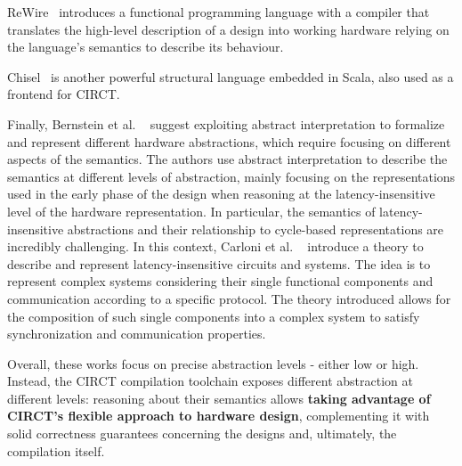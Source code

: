 \documentclass[sigconf,authorversion,nonacm, 11pt]{acmart}
\begin{document}
ReWire~\cite{procter2015semantics} introduces a functional programming language with a compiler that translates the high-level 
description of a design into working hardware relying on the language's semantics to describe its behaviour.

Chisel~\cite{bachrach2012chisel} is another powerful structural language embedded in Scala, also used as a frontend for CIRCT. 

Finally, Bernstein et al. ~\cite{bernstein2021semantics} suggest exploiting abstract interpretation to formalize and represent 
different hardware abstractions, which require focusing on different aspects of the semantics. 
The authors use abstract interpretation to describe the semantics at different levels of abstraction, 
mainly focusing on the representations used in the early phase of the design when reasoning at the latency-insensitive level of the hardware representation.
In particular, the semantics of latency-insensitive abstractions and their relationship to cycle-based representations are incredibly challenging. 
In this context, Carloni et al. ~\cite{carloni2001theory} introduce a theory to describe and represent latency-insensitive circuits and systems. 
The idea is to represent complex systems considering their single functional components and communication according to a specific protocol. 
The theory introduced allows for the composition of such single components into a complex system to satisfy synchronization and communication properties. 

Overall, these works focus on precise abstraction levels - either low or high. 
Instead, the CIRCT compilation toolchain exposes different abstraction at different levels: 
reasoning about their semantics allows \textbf{taking advantage of CIRCT’s flexible approach to hardware design}, complementing it with solid correctness 
guarantees concerning the designs and, ultimately, the compilation itself.
\end{document}
